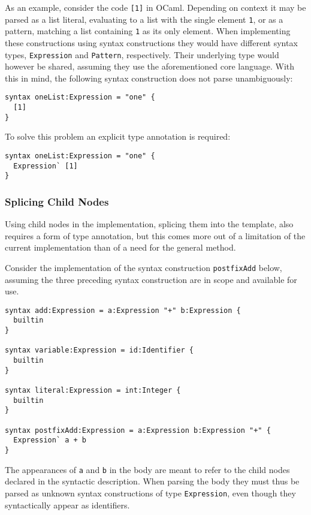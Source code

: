 \documentclass{kththesis}
\begin{document}
As an example, consider the code \texttt{[1]} in OCaml. Depending on context it may be parsed as a list literal, evaluating to a list with the single element \texttt{1}, or as a pattern, matching a list containing \texttt{1} as its only element. When implementing these constructions using syntax constructions they would have different syntax types, \texttt{Expression} and \texttt{Pattern}, respectively. Their underlying type would however be shared, assuming they use the aforementioned core language. With this in mind, the following syntax construction does not parse unambiguously:

\begin{verbatim}
syntax oneList:Expression = "one" {
  [1]
}
\end{verbatim}

To solve this problem an explicit type annotation is required:

\begin{verbatim}
syntax oneList:Expression = "one" {
  Expression` [1]
}
\end{verbatim}

\subsubsection{Splicing Child Nodes}

Using child nodes in the implementation, splicing them into the template, also requires a form of type annotation, but this comes more out of a limitation of the current implementation than of a need for the general method.

Consider the implementation of the syntax construction \texttt{postfixAdd} below, assuming the three preceding syntax construction are in scope and available for use.

\begin{verbatim}
syntax add:Expression = a:Expression "+" b:Expression {
  builtin
}

syntax variable:Expression = id:Identifier {
  builtin
}

syntax literal:Expression = int:Integer {
  builtin
}

syntax postfixAdd:Expression = a:Expression b:Expression "+" {
  Expression` a + b
}
\end{verbatim}

The appearances of \texttt{a} and \texttt{b} in the body are meant to refer to the child nodes declared in the syntactic description. When parsing the body they must thus be parsed as unknown syntax constructions of type \texttt{Expression}, even though they syntactically appear as identifiers.
\end{document}
